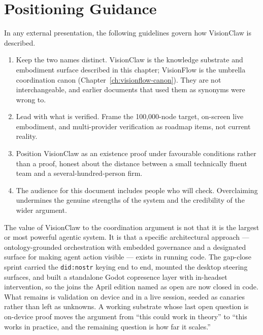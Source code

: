 \section{Positioning Guidance}

In any external presentation, the following guidelines govern how VisionClaw is described.

\begin{enumerate}
  \item Keep the two names distinct. VisionClaw is the knowledge substrate and embodiment surface described in this chapter; VisionFlow is the umbrella coordination canon (Chapter~\ref{ch:visionflow-canon}). They are not interchangeable, and earlier documents that used them as synonyms were wrong to.
  \item Lead with what is verified. Frame the 100,000-node target, on-screen live embodiment, and multi-provider verification as roadmap items, not current reality.
  \item Position VisionClaw as an existence proof under favourable conditions rather than a proof, honest about the distance between a small technically fluent team and a several-hundred-person firm.
  \item The audience for this document includes people who will check. Overclaiming undermines the genuine strengths of the system and the credibility of the wider argument.
\end{enumerate}

\begin{keyinsight}
The value of VisionClaw to the coordination argument is not that it is the largest or most powerful agentic system. It is that a specific architectural approach --- ontology-grounded orchestration with embedded governance and a designated surface for making agent action visible --- exists in running code. The gap-close sprint carried the \texttt{did:nostr} keying end to end, mounted the desktop steering surfaces, and built a standalone Godot copresence layer with in-headset intervention, so the joins the April edition named as open are now closed in code. What remains is validation on device and in a live session, seeded as canaries rather than left as unknowns. A working substrate whose last open question is on-device proof moves the argument from ``this could work in theory'' to ``this works in practice, and the remaining question is how far it scales.''
\end{keyinsight}
